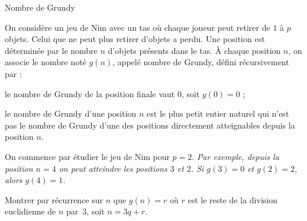 \begin{exo}[PC][1][devoir]{Nombre de Grundy}
  
On considère un jeu de Nim avec un tas où chaque joueur peut retirer de $1$ à $p$ objets. Celui que ne peut plus retirer d'objets a perdu. Une position est déterminée par le nombre $n$ d'objets présents dans le tas.
À chaque position $n$, on associe le nombre noté $g(n)$, appelé nombre de Grundy, défini récursivement par :
\begin{liste}
  \item le nombre de Grundy de la position finale vaut $0$, soit $g(0)=0$ ;
  \item le nombre de Grundy d'une position $n$ est le plus petit entier naturel qui n'est pas le nombre de Grundy d'une des positions directement atteignables depuis la position $n$.
\end{liste}

On commence par étudier le jeu de Nim pour $p=2$.
\emph{Par exemple, depuis la position $n=4$ on peut atteindre les positions $3$ et $2$. Si $g(3)=0$ et $g(2)=2$, alors $g(4)=1$.}

\begin{quest}
    \item Montrer par récurrence sur $n$ que $g(n)=r$ où $r$ est le reste de la division euclidienne de $n$ par~$3$, soit $n=3q+r$.
\end{quest}
\end{exo}
